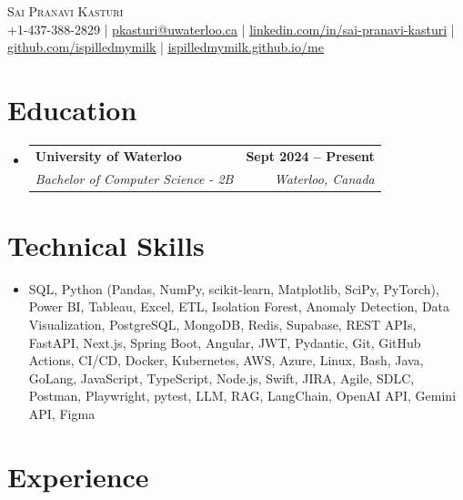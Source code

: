 \documentclass[letterpaper,10pt]{article}
\makeatletter
\newcommand{\resumeSubheading}[4]{
  \vspace{-1pt}\item
    \begin{tabular*}{1.0\textwidth}[t]{l@{\extracolsep{\fill}}r}
      \textbf{#1} & \textbf{\small #2} \\
      \textit{\small#3} & \textit{\small #4} \\[-2pt]
    \end{tabular*}\vspace{-7pt}
}
\newcommand{\resumeSubHeadingListStart}{\begin{itemize}[leftmargin=0.0in, label={}]}
\newcommand{\resumeSubHeadingListEnd}{\end{itemize}}
\makeatother
\begin{document}

\vspace{-28pt}
\begin{center}
    {\Huge \scshape Sai Pranavi Kasturi} \\ 
    
    \small +1-437-388-2829 | \underline{pkasturi@uwaterloo.ca} | \href{https://linkedin.com/in/sai-pranavi-kasturi-704807298}{\underline{linkedin.com/in/sai-pranavi-kasturi}} | \href{https://github.com/ispilledmymilk}{\underline{github.com/ispilledmymilk}} | \href{https://ispilledmymilk.github.io/me/}{\underline{ispilledmymilk.github.io/me}}
    \vspace{-10pt}
\end{center}

\vspace{-10pt}
\section{Education}
  \resumeSubHeadingListStart
    \resumeSubheading
      {University of Waterloo}{Sept 2024 -- Present}
      {Bachelor of Computer Science - 2B}{Waterloo, Canada}
  \resumeSubHeadingListEnd
\vspace{-8pt}
  

\section{Technical Skills}
\begin{itemize}[leftmargin=0.05in, label={}]
  \small\item{
    SQL, Python (Pandas, NumPy, scikit-learn, Matplotlib, SciPy, PyTorch), Power BI, Tableau, Excel, ETL, Isolation Forest, Anomaly Detection, Data Visualization, PostgreSQL, MongoDB, Redis, Supabase, REST APIs, FastAPI, Next.js, Spring Boot, Angular, JWT, Pydantic, Git, GitHub Actions, CI/CD, Docker, Kubernetes, AWS, Azure, Linux, Bash, Java, GoLang, JavaScript, TypeScript, Node.js, Swift, JIRA, Agile, SDLC, Postman, Playwright, pytest, LLM, RAG, LangChain, OpenAI API, Gemini API, Figma
  }
\end{itemize}
 \vspace{-18pt}

\vspace{1.20pt}
\section{Experience}
\end{document}
